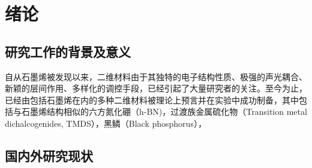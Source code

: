 \chapter{绪\hspace{6pt}论}

\section{研究工作的背景及意义}
自从石墨烯被发现以来，二维材料由于其独特的电子结构性质、极强的声光耦合、新颖的层间作用、多样化的调控手段，已经引起了大量研究者的关注。至今为止，已经由包括石墨烯在内的多种二维材料被理论上预言并在实验中成功制备，其中包括与石墨烯结构相似的六方氮化硼（h-BN)，过渡族金属硫化物（Transition metal dichalcogenides, TMDS），黑鳞（Black phosphorus），


\section{国内外研究现状}